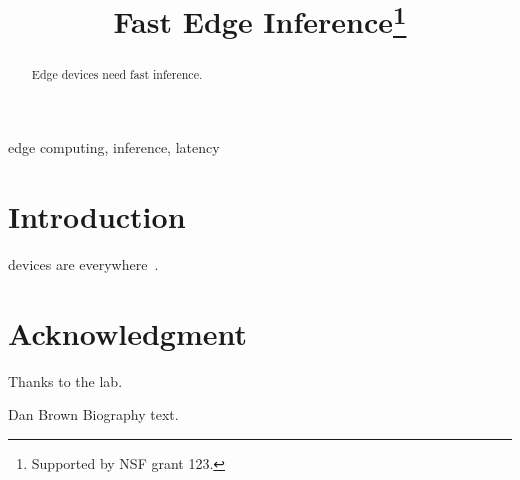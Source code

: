 \documentclass[conference]{IEEEtran}
\begin{document}
\title{Fast Edge Inference\thanks{Supported by NSF grant 123.}}

\author{
\and
{}
}

\maketitle

\begin{abstract}
Edge devices need fast inference.
\end{abstract}

\begin{IEEEkeywords}
edge computing, inference, latency
\end{IEEEkeywords}

\section{Introduction}
 devices are everywhere~\cite{knuth,lamport}.

\section*{Acknowledgment}
Thanks to the lab.




\begin{IEEEbiography}{Dan Brown}
Biography text.
\end{IEEEbiography}
\end{document}

